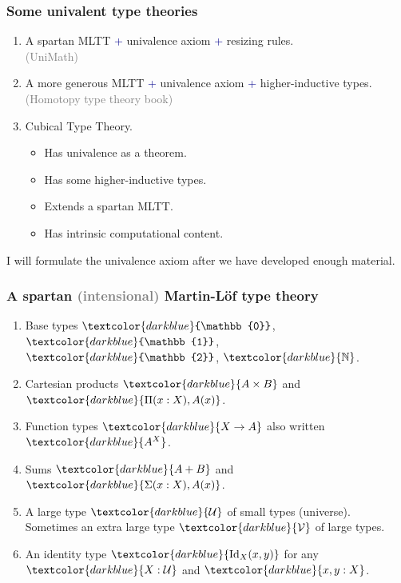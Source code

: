 \documentclass[aspectratio=169]{beamer}
\newcommand{\U}{\operatorname{\mathcal{U}}}
\newcommand{\V}{\operatorname{\mathcal{V}}}
\newcommand{\db}{\textcolor{darkblue}}
\newcommand{\grey}{\textcolor{grey}}
\newcommand{\m}[1]{$\db{#1}$}
\newcommand{\N}{\mathbb{N}}
\newcommand{\Id}{\operatorname{Id}}
\begin{document}
\begin{frame}
  \frametitle{Some univalent type theories}

  \begin{enumerate}
  \vfill \item A spartan MLTT \db{+} univalence axiom \db{+} resizing rules. \\[1ex]
  \grey{(UniMath)}

  \vfill \item A more generous MLTT \db{+} univalence axiom \db{+} higher-inductive types. \\[1ex]
  \grey{(Homotopy type theory book)}

  \vfill \item Cubical Type Theory.\\[1ex]
  \begin{itemize}
  \item  Has univalence as a theorem.
  \item  Has some higher-inductive types.
  \item  Extends a spartan MLTT.
  \item  Has intrinsic computational content.
  \end{itemize}
  \end{enumerate}

  I will formulate the univalence axiom after we have developed enough
  material.

\end{frame}

\begin{frame}
  \frametitle{A spartan \grey{(intensional)} Martin-L\"of type theory}

\vfill

  \begin{enumerate}
  \vfill \item Base types \m{\mathbb{0}}, \m{\mathbb{1}},  \m{\mathbb{2}}, \m{\N}.
  \vfill \item Cartesian products \m{A \times B} and \m{\Pi(x:X), A(x)}.
  \vfill \item Function types \m{X \to A} also written \m{A^X}.
  \vfill \item Sums \m{A + B} and \m{\Sigma(x:X), A(x)}.
  \vfill \item A large type \m{\U} of small types (universe). \\[1ex] Sometimes an extra large type \m{\V} of large types.
  \vfill \item An identity type \m{\Id_X(x,y)} for any \m{X : \U} and \m{x,y:X}.
\end{enumerate}

\vfill

\end{frame}
\end{document}

